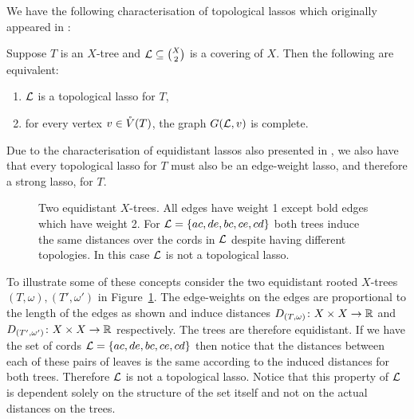 We have the following characterisation of topological lassos which originally
appeared in \cite{HP13}:
\begin{lem}
  \label{lem:child-edge-graph-complete}
  Suppose $T$ is an $X$-tree and ${\mathcal L} \subseteq {X \choose 2}$ is a covering
  of $X$.  Then the following are equivalent:
  \begin{enumerate}
  \item ${\mathcal L}$ is a topological lasso for $T$,
  \item for every vertex $v \in \mathring{V}(T)$, the graph $G({\mathcal L},v)$ is complete.
  \end{enumerate}
\end{lem}

Due to the characterisation of equidistant lassos also presented in
\cite{HP13}, we also have that every topological lasso for $T$ must also be an
edge-weight lasso, and therefore a strong lasso, for $T$.

\begin{figure}
\begin{center}

\end{center}
\caption{Two equidistant $X$-trees.  All edges have weight 1 except bold edges
  which have weight 2.  For ${\mathcal L}=\{ac,de,bc,ce,cd\}$ both trees induce the
  same distances over the cords in ${\mathcal L}$ despite having different topologies.
  In this case ${\mathcal L}$ is not a topological lasso.}
\label{fig:lasso-example}
\end{figure}

To illustrate some of these concepts consider the two equidistant rooted
$X$-trees $(T,\omega),(T',\omega')$ in Figure~\ref{fig:lasso-example}.  The
edge-weights on the edges are proportional to the length of the edges as shown
and induce distances $D_{(T,\omega)} \colon X \times X \to {\mathbb R}$ and
$D_{(T',\omega')} \colon X \times X \to {\mathbb R}$ respectively.  The trees are
therefore equidistant.  If we have the set of cords ${\mathcal L}=\{ac,de,bc,ce,cd\}$
then notice that the distances between each of these pairs of leaves is the
same according to the induced distances for both trees.  Therefore ${\mathcal L}$ is
not a topological lasso.  Notice that this property of ${\mathcal L}$ is dependent
solely on the structure of the set itself and not on the actual distances on
the trees.

